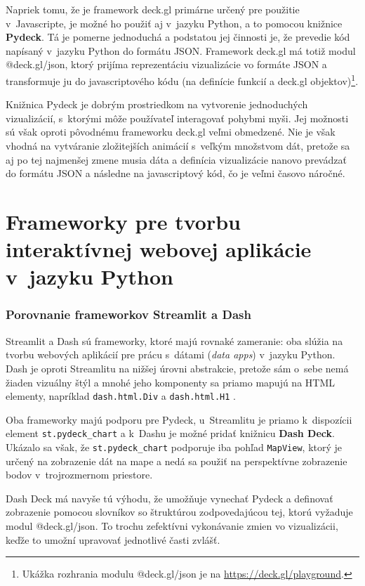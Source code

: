 Napriek tomu, že je framework deck.gl primárne určený pre použitie v~Javascripte, je možné ho použiť aj v~jazyku Python, a to pomocou knižnice \textbf{Pydeck}. Tá je pomerne jednoduchá a podstatou jej činnosti je, že prevedie kód napísaný v~jazyku Python do formátu JSON. Framework deck.gl má totiž modul @deck.gl/json, ktorý prijíma reprezentáciu vizualizácie vo formáte JSON a transformuje ju do javascriptového kódu (na definície funkcií a deck.gl objektov)\footnote{Ukážka rozhrania modulu @deck.gl/json je na \url{https://deck.gl/playground}.}.

Knižnica Pydeck je dobrým prostriedkom na vytvorenie jednoduchých vizualizácií, s~ktorými môže používateľ interagovať pohybmi myši. Jej možnosti sú však oproti pôvodnému frameworku deck.gl veľmi obmedzené. Nie je však vhodná na vytváranie zložitejších animácií s~veľkým množstvom dát, pretože sa aj po tej najmenšej zmene musia dáta a definícia vizualizácie nanovo prevádzať do formátu JSON a následne na javascriptový kód, čo je veľmi časovo náročné.

\section{Frameworky pre tvorbu interaktívnej webovej aplikácie v~jazyku Python}

\subsubsection{Porovnanie frameworkov Streamlit a Dash}

Streamlit a Dash sú frameworky, ktoré majú rovnaké zameranie: oba slúžia na tvorbu webových aplikácií pre prácu s~dátami (\emph{data apps}) v~jazyku Python. Dash je oproti Streamlitu na nižšej úrovni abstrakcie, pretože sám o~sebe nemá žiaden vizuálny štýl a mnohé jeho komponenty sa priamo mapujú na HTML elementy, napríklad \texttt{dash.html.Div} a \texttt{dash.html.H1} \cite{streamlit_documentation}\cite{dash_documentation}.

Oba frameworky majú podporu pre Pydeck, u~Streamlitu je priamo k~dispozícii element \texttt{st.pydeck\_chart} a k~Dashu je možné pridať knižnicu \textbf{Dash Deck}. Ukázalo sa však, že \texttt{st.pydeck\_chart} podporuje iba pohľad \texttt{MapView}, ktorý je určený na zobrazenie dát na mape a nedá sa použiť na perspektívne zobrazenie bodov v~trojrozmernom priestore.

Dash Deck má navyše tú výhodu, že umožňuje vynechať Pydeck a definovať zobrazenie pomocou slovníkov so štruktúrou zodpovedajúcou tej, ktorú vyžaduje modul @deck.gl/json. To trochu zefektívni vykonávanie zmien vo vizualizácii, keďže to umožní upravovať jednotlivé časti zvlášť.

